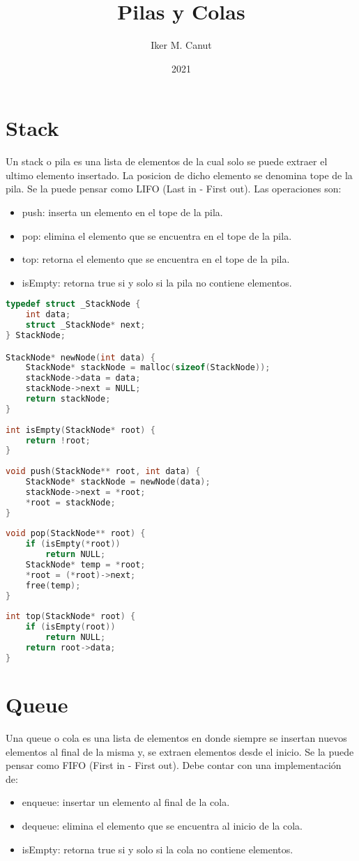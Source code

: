 \documentclass[11pt,a4paper]{article}
\author{Iker M. Canut}
\title{Pilas y Colas}
\date{2021}
\begin{document}
\maketitle
\newpage

\section{Stack}
Un stack o pila es una lista de elementos de la cual solo se puede extraer el ultimo elemento insertado. La posicion de dicho elemento se denomina tope de la pila. Se la puede pensar como LIFO (Last in - First out). Las operaciones son:
\begin{itemize}
\itemsep -0.4em
\item push: inserta un elemento en el tope de la pila.
\item pop: elimina el elemento que se encuentra en el tope de la pila.
\item top: retorna el elemento que se encuentra en el tope de la pila.
\item isEmpty: retorna true si y solo si la pila no contiene elementos.
\end{itemize}

\begin{lstlisting}[language=C]
typedef struct _StackNode {
    int data;
    struct _StackNode* next;
} StackNode;

StackNode* newNode(int data) {
    StackNode* stackNode = malloc(sizeof(StackNode));
    stackNode->data = data;
    stackNode->next = NULL;
    return stackNode;
}
 
int isEmpty(StackNode* root) {
    return !root;
}
 
void push(StackNode** root, int data) {
    StackNode* stackNode = newNode(data);
    stackNode->next = *root;
    *root = stackNode;
}
 
void pop(StackNode** root) {
    if (isEmpty(*root))
        return NULL;
    StackNode* temp = *root;
    *root = (*root)->next;
    free(temp);
}
 
int top(StackNode* root) {
    if (isEmpty(root))
        return NULL;
    return root->data;
}
\end{lstlisting}

\newpage

\section{Queue}
Una queue o cola es una lista de elementos en donde siempre se insertan nuevos elementos al final de la misma y, se extraen elementos desde el inicio. Se la puede pensar como FIFO (First in - First out). Debe contar con una implementaci\'on de:
\begin{itemize}
\itemsep -0.4em
\item enqueue: insertar un elemento al final de la cola.
\item dequeue: elimina el elemento que se encuentra al inicio de la cola.
\item isEmpty: retorna true si y solo si la cola no contiene elementos.
\end{itemize}
\end{document}
